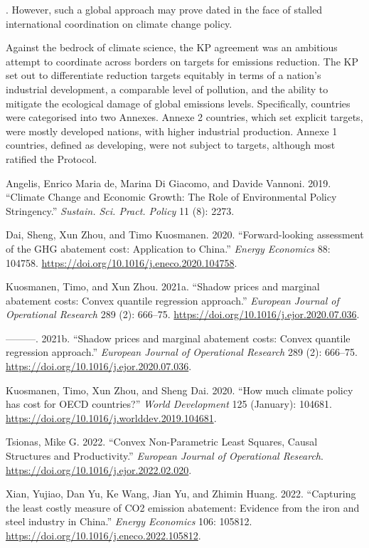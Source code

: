 \documentclass[
]{article}\usepackage{amsmath,amssymb}
\newlength{\cslhangindent}
\newlength{\cslentryspacingunit} %
\newenvironment{CSLReferences}[2] %
 {%
  \setlength{\parindent}{0pt}
  \ifodd #1
  \let\oldpar\par
  \def\par{\hangindent=\cslhangindent\oldpar}
  \fi
  \setlength{\parskip}{#2\cslentryspacingunit}
 }%
 {}
\begin{document}
. However, such a global approach may prove dated in the face of stalled
international coordination on climate change policy.

Against the bedrock of climate science, the KP agreement was an
ambitious attempt to coordinate across borders on targets for emissions
reduction. The KP set out to differentiate reduction targets equitably
in terms of a nation's industrial development, a comparable level of
pollution, and the ability to mitigate the ecological damage of global
emissions levels. Specifically, countries were categorised into two
Annexes. Annexe 2 countries, which set explicit targets, were mostly
developed nations, with higher industrial production. Annexe 1
countries, defined as developing, were not subject to targets, although
most ratified the Protocol.

\hypertarget{refs}{}
\begin{CSLReferences}{1}{0}
\leavevmode{}%
Angelis, Enrico Maria de, Marina Di Giacomo, and Davide Vannoni. 2019.
{``Climate Change and Economic Growth: The Role of Environmental Policy
Stringency.''} \emph{Sustain. Sci. Pract. Policy} 11 (8): 2273.

\leavevmode{}%
Dai, Sheng, Xun Zhou, and Timo Kuosmanen. 2020. {``{Forward-looking
assessment of the GHG abatement cost: Application to China}.''}
\emph{Energy Economics} 88: 104758.
\url{https://doi.org/10.1016/j.eneco.2020.104758}.

\leavevmode{}%
Kuosmanen, Timo, and Xun Zhou. 2021a. {``{Shadow prices and marginal
abatement costs: Convex quantile regression approach}.''} \emph{European
Journal of Operational Research} 289 (2): 666--75.
\url{https://doi.org/10.1016/j.ejor.2020.07.036}.

\leavevmode{}%
---------. 2021b. {``{Shadow prices and marginal abatement costs: Convex
quantile regression approach}.''} \emph{European Journal of Operational
Research} 289 (2): 666--75.
\url{https://doi.org/10.1016/j.ejor.2020.07.036}.

\leavevmode{}%
Kuosmanen, Timo, Xun Zhou, and Sheng Dai. 2020. {``{How much climate
policy has cost for OECD countries?}''} \emph{World Development} 125
(January): 104681. \url{https://doi.org/10.1016/j.worlddev.2019.104681}.

\leavevmode{}%
Tsionas, Mike G. 2022. {``{Convex Non-Parametric Least Squares, Causal
Structures and Productivity}.''} \emph{European Journal of Operational
Research}. \url{https://doi.org/10.1016/j.ejor.2022.02.020}.

\leavevmode{}%
Xian, Yujiao, Dan Yu, Ke Wang, Jian Yu, and Zhimin Huang. 2022.
{``{Capturing the least costly measure of CO2 emission abatement:
Evidence from the iron and steel industry in China}.''} \emph{Energy
Economics} 106: 105812.
\url{https://doi.org/10.1016/j.eneco.2022.105812}.

\end{CSLReferences}
\end{document}
